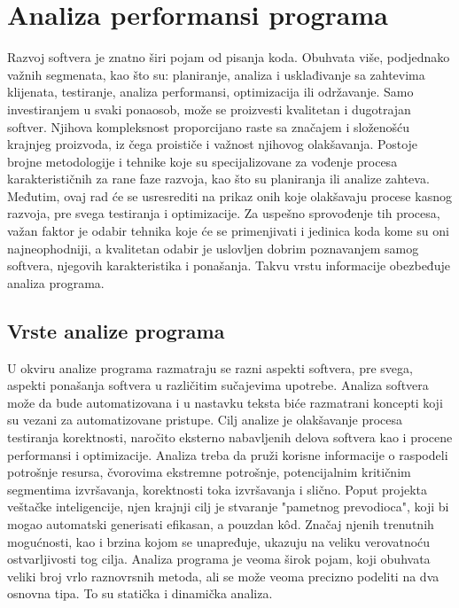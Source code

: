 \documentclass[12pt,oneside]{memoir}
\begin{document}
\chapter{Analiza performansi programa}


Razvoj softvera je znatno širi pojam od pisanja koda. Obuhvata više, podjednako važnih segmenata, kao što su: planiranje, analiza i usklađivanje sa zahtevima klijenata, testiranje, analiza performansi, optimizacija ili održavanje. Samo investiranjem u svaki ponaosob, može se proizvesti kvalitetan i dugotrajan softver. Njihova kompleksnost proporcijano raste sa značajem i složenošću krajnjeg proizvoda, iz čega proističe i važnost njihovog olakšavanja. Postoje brojne metodologije i tehnike koje su specijalizovane za vođenje procesa karakterističnih za rane faze razvoja, kao što su planiranja ili analize zahteva. Međutim, ovaj rad će se usresrediti na prikaz onih koje olakšavaju procese kasnog razvoja, pre svega testiranja i optimizacije. Za uspešno sprovođenje tih procesa, važan faktor je odabir tehnika koje će se primenjivati i jedinica koda kome su oni najneophodniji, a kvalitetan odabir je uslovljen dobrim poznavanjem samog softvera, njegovih karakteristika i ponašanja. Takvu vrstu informacije obezbeđuje analiza programa.

\section{Vrste analize programa}

U okviru analize programa razmatraju se razni aspekti softvera, pre svega, aspekti ponašanja softvera u različitim sučajevima upotrebe. Analiza softvera može da bude automatizovana i u nastavku teksta biće razmatrani koncepti koji su vezani za automatizovane pristupe. Cilj analize je olakšavanje procesa testiranja korektnosti, naročito eksterno nabavljenih delova softvera kao i procene performansi i optimizacije. Analiza treba da pruži korisne informacije o raspodeli potrošnje resursa, čvorovima ekstremne potrošnje, potencijalnim kritičnim segmentima izvršavanja, korektnosti toka izvršavanja i slično. Poput projekta veštačke inteligencije, njen krajnji cilj je stvaranje "pametnog prevodioca", koji bi mogao automatski generisati efikasan, a pouzdan k\^{o}d. Značaj njenih trenutnih mogućnosti, kao i brzina kojom se unapređuje, ukazuju na veliku verovatnoću ostvarljivosti tog cilja. Analiza programa je veoma širok pojam, koji obuhvata veliki broj vrlo raznovrsnih metoda, ali se može veoma precizno podeliti na dva osnovna tipa. To su statička i dinamička analiza.
\end{document}
